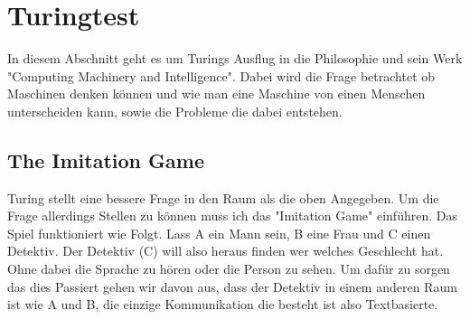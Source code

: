 \section{Turingtest}
In diesem Abschnitt geht es um Turings Ausflug in die Philosophie und sein Werk "Computing Machinery and Intelligence". Dabei wird die Frage betrachtet ob Maschinen denken können und wie man eine Maschine von einen Menschen unterscheiden kann, sowie die Probleme die dabei entstehen.
\subsection{The Imitation Game}
Turing stellt eine bessere Frage in den Raum als die oben Angegeben. Um die Frage allerdings Stellen zu können muss ich das "Imitation Game" einführen. Das Spiel funktioniert wie Folgt. Lass A ein Mann sein, B eine Frau und C einen Detektiv. Der Detektiv (C) will also heraus finden wer welches Geschlecht hat. Ohne dabei die Sprache zu hören oder die Person zu sehen. Um dafür zu sorgen das dies Passiert gehen wir davon aus, dass der Detektiv in einem anderen Raum ist wie A und B, die einzige Kommunikation die besteht ist also Textbasierte.